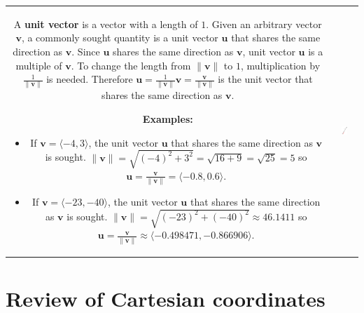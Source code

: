 \documentclass{article}
\begin{document}
\begin{tabular}{cc}
\parbox{0.7\textwidth}{
A {\bf unit vector} is a vector with a length of \(1\). Given an arbitrary vector \(\mathbf{v}\), a commonly sought quantity is a unit vector \(\mathbf{u}\) that shares the same direction as \(\mathbf{v}\). Since \(\mathbf{u}\) shares the same direction as \(\mathbf{v}\), unit vector \(\mathbf{u}\) is a multiple of \(\mathbf{v}\). To change the length from \(\|\mathbf{v}\|\) to \(1\), multiplication by \(\frac{1}{\|\mathbf{v}\|}\) is needed. Therefore \(\mathbf{u} = \frac{1}{\|\mathbf{v}\|}\mathbf{v} = \frac{\mathbf{v}}{\|\mathbf{v}\|}\) is the unit vector that shares the same direction as \(\mathbf{v}\). 

\textbf{Examples:}
\begin{itemize}
\item If \(\mathbf{v} = \langle -4, 3 \rangle\), the unit vector \(\mathbf{u}\) that shares the same direction as \(\mathbf{v}\) is sought. \(\|\mathbf{v}\| = \sqrt{(-4)^2 + 3^2} = \sqrt{16 + 9} = \sqrt{25} = 5\) so \(\mathbf{u} = \frac{\mathbf{v}}{\|\mathbf{v}\|} = \langle -0.8, 0.6 \rangle\). 
\item If \(\mathbf{v} = \langle -23, -40 \rangle\), the unit vector \(\mathbf{u}\) that shares the same direction as \(\mathbf{v}\) is sought. \(\|\mathbf{v}\| = \sqrt{(-23)^2 + (-40)^2} \approx 46.1411\) so \(\mathbf{u} = \frac{\mathbf{v}}{\|\mathbf{v}\|} \approx \langle -0.498471 , -0.866906 \rangle\).
\end{itemize}
} & \parbox{0.3\textwidth}{
\includegraphics[width = 0.3\textwidth]{unit_vector}
}
\end{tabular}




\section*{Review of Cartesian coordinates}
\end{document}
